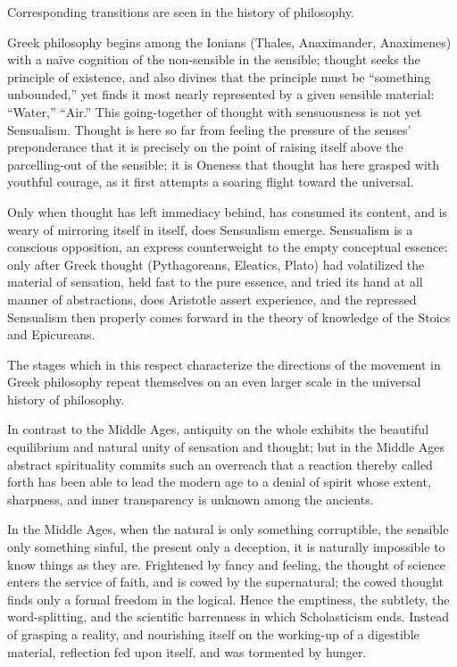 \documentclass[12pt]{book}
\begin{document}
Corresponding transitions are seen in the history of philosophy.

Greek philosophy begins among the Ionians (Thales, Anaximander, Anaximenes) with
a naïve cognition of the non-sensible in the sensible; thought seeks the
principle of existence, and also divines that the principle must be ``something
unbounded,'' yet finds it most nearly represented by a given sensible material:
``Water,'' ``Air.'' This going-together of thought with sensuousness is not yet
Sensualism. Thought is here so far from feeling the pressure of the senses'
preponderance that it is precisely on the point of raising itself above the
parcelling-out of the sensible; it is Oneness that thought has here grasped with
youthful courage, as it first attempts a soaring flight toward the universal.

Only when thought has left immediacy behind, has consumed its content, and is
weary of mirroring itself in itself, does Sensualism emerge. Sensualism is a
conscious opposition, an express counterweight to the empty conceptual essence:
only after Greek thought (Pythagoreans, Eleatics, Plato) had volatilized the
material of sensation, held fast to the pure essence, and tried its hand at all
manner of abstractions, does Aristotle assert experience, and the repressed
Sensualism then properly comes forward in the theory of knowledge of the Stoics
and Epicureans.

The stages which in this respect characterize the directions of the movement in
Greek philosophy repeat themselves on an even larger scale in the universal
history of philosophy.

In contrast to the Middle Ages, antiquity on the whole exhibits the beautiful
equilibrium and natural unity of sensation and thought; but in the Middle Ages
abstract
spirituality commits such an overreach that a reaction thereby called forth has
been able to lead the modern age to a denial of spirit whose extent, sharpness,
and inner transparency is unknown among the ancients.

In the Middle Ages, when the natural is only something corruptible, the sensible
only something sinful, the present only a deception, it is naturally impossible
to know things as they are. Frightened by fancy and feeling, the thought of
science enters the service of faith, and is cowed by the supernatural; the cowed
thought finds only a formal freedom in the logical. Hence the emptiness, the
subtlety, the word-splitting, and the scientific barrenness in which Scholasticism
ends. Instead of grasping a reality, and nourishing itself on the working-up of a
digestible material, reflection fed upon itself, and was tormented by hunger.
\end{document}
